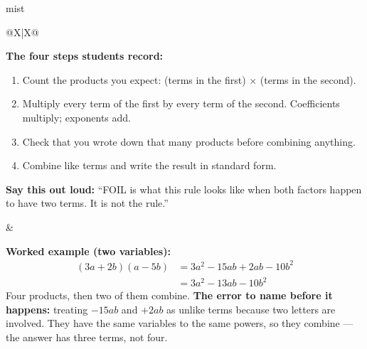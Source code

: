 \documentclass[10pt]{article}
\begin{document}
\boxguard
\begin{skillbox}{mist}
\begin{tabularx}{\linewidth}{@{}X|X@{}}
\begin{minipage}[t]{\linewidth}\vspace{0pt}
\textbf{The four steps students record:}
\begin{enumerate}[leftmargin=1.4em, itemsep=2pt, topsep=2pt]
  \item Count the products you expect: (terms in the first) $\times$ (terms in the second).
  \item Multiply every term of the first by every term of the second. Coefficients multiply;
        exponents add.
  \item Check that you wrote down that many products before combining anything.
  \item Combine like terms and write the result in standard form.
\end{enumerate}
\textbf{Say this out loud:} ``FOIL is what this rule looks like when both factors happen to have
two terms. It is not the rule.''
\end{minipage}
&
\begin{minipage}[t]{\linewidth}\vspace{0pt}
\textbf{Worked example (two variables):}
\[
\begin{aligned}
(3a+2b)(a-5b) &= 3a^2-15ab+2ab-10b^2 \\
              &= 3a^2-13ab-10b^2
\end{aligned}
\]
Four products, then two of them combine. \textbf{The error to name before it happens:} treating
$-15ab$ and $+2ab$ as unlike terms because two letters are involved. They have the same variables
to the same powers, so they combine --- the answer has three terms, not four.
\end{minipage}
\end{tabularx}
\end{skillbox}
\end{document}
